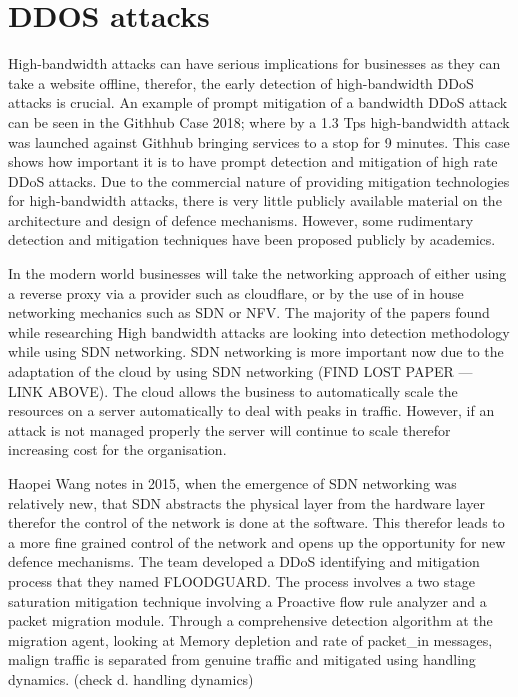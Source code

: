 
\section{DDOS attacks} \label{attack2}

High-bandwidth attacks can have serious implications for businesses as they can take a website offline, therefor, the early detection of high-bandwidth DDoS attacks is crucial. An example of prompt mitigation of a bandwidth DDoS attack can be seen in the Githhub Case 2018; where by a 1.3 Tps high-bandwidth attack was launched against Githhub bringing services to a stop for 9 minutes. \cite{Githhubattacks} This case shows how important it is to have prompt detection and mitigation of high rate DDoS attacks. Due to the commercial nature of providing mitigation technologies for high-bandwidth attacks, there is very little publicly available material on the architecture and design of defence mechanisms. However, some rudimentary detection and mitigation techniques have been proposed publicly by academics. 

In the modern world businesses will take the networking approach of either using a reverse proxy via a provider such as cloudflare, or by the use of in house networking mechanics such as SDN or NFV. The majority of the papers found while researching High bandwidth attacks are looking into detection methodology while using SDN networking. SDN networking is more important now due to the adaptation of the cloud by using SDN networking (FIND LOST PAPER --- LINK ABOVE). The cloud allows the business to automatically scale the resources on a server automatically to deal with peaks in traffic. However, if an attack is not managed properly the server will continue to scale therefor increasing cost for the organisation. 

Haopei Wang notes in 2015, when the emergence of SDN networking was relatively new, that SDN abstracts the physical layer from the hardware layer therefor the control of the network is done at the software. This therefor leads to a more fine grained control of the network and opens up the opportunity for new defence mechanisms. The team developed a DDoS identifying and mitigation process that they named FLOODGUARD. The process involves a two stage saturation mitigation technique involving a Proactive flow rule analyzer and a packet migration module. Through a comprehensive detection algorithm at the migration agent, looking at Memory depletion and rate of packet\_in messages, malign traffic is separated from genuine traffic and mitigated using handling dynamics. (check d. handling dynamics)


